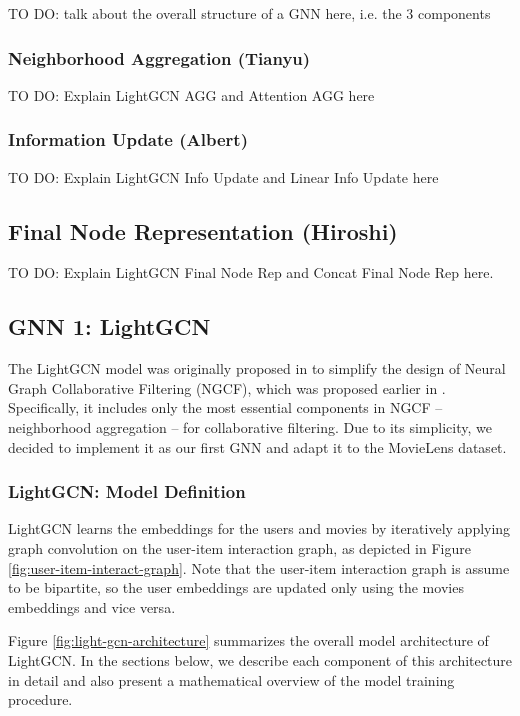 \documentclass{article}
\begin{document}
TO DO: talk about the overall structure of a GNN here, i.e. the 3 components

\subsubsection{Neighborhood Aggregation (Tianyu)}

TO DO: Explain LightGCN AGG and Attention AGG here

\subsubsection{Information Update (Albert)}

TO DO: Explain LightGCN Info Update and Linear Info Update here

\subsection{Final Node Representation (Hiroshi)}

TO DO: Explain LightGCN Final Node Rep and Concat Final Node Rep here.

\subsection{GNN 1: LightGCN}

The LightGCN model was originally proposed in \cite{lightgcn} to simplify the design of Neural Graph Collaborative Filtering (NGCF), which was proposed earlier in \cite{ngcf}. Specifically, it includes only the most essential components in NGCF -- neighborhood aggregation -- for collaborative filtering. Due to its simplicity, we decided to implement it as our first GNN and adapt it to the MovieLens dataset.

\subsubsection{LightGCN: Model Definition}

LightGCN learns the embeddings for the users and movies by iteratively applying graph convolution on the user-item interaction graph, as depicted in Figure \ref{fig:user-item-interact-graph}. Note that the user-item interaction graph is assume to be bipartite, so the user embeddings are updated only using the movies embeddings and vice versa.

Figure \ref{fig:light-gcn-architecture} summarizes the overall model architecture of LightGCN. In the sections below, we describe each component of this architecture in detail and also present a mathematical overview of the model training procedure.
\end{document}
